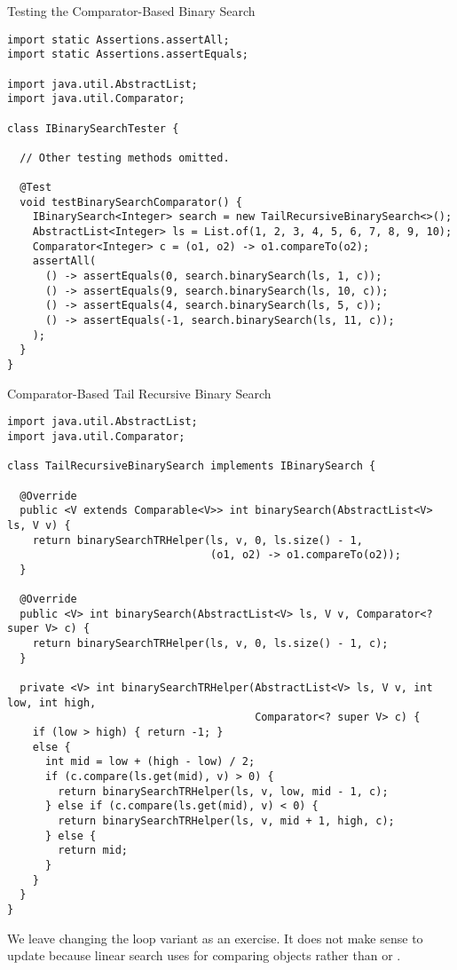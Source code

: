 \begin{cl}{Testing the Comparator-Based Binary Search}
\begin{lstlisting}[language=MyJava]
import static Assertions.assertAll;
import static Assertions.assertEquals;

import java.util.AbstractList;
import java.util.Comparator;

class IBinarySearchTester {

  // Other testing methods omitted.

  @Test
  void testBinarySearchComparator() {
    IBinarySearch<Integer> search = new TailRecursiveBinarySearch<>();
    AbstractList<Integer> ls = List.of(1, 2, 3, 4, 5, 6, 7, 8, 9, 10);
    Comparator<Integer> c = (o1, o2) -> o1.compareTo(o2);
    assertAll(
      () -> assertEquals(0, search.binarySearch(ls, 1, c));
      () -> assertEquals(9, search.binarySearch(ls, 10, c));
      () -> assertEquals(4, search.binarySearch(ls, 5, c));
      () -> assertEquals(-1, search.binarySearch(ls, 11, c));
    );
  }
}
\end{lstlisting}
\end{cl}

\begin{cl}{Comparator-Based Tail Recursive Binary Search}
\begin{lstlisting}[language=MyJava]
import java.util.AbstractList;
import java.util.Comparator;

class TailRecursiveBinarySearch implements IBinarySearch {
  
  @Override
  public <V extends Comparable<V>> int binarySearch(AbstractList<V> ls, V v) {
    return binarySearchTRHelper(ls, v, 0, ls.size() - 1,
                                (o1, o2) -> o1.compareTo(o2));
  }
  
  @Override
  public <V> int binarySearch(AbstractList<V> ls, V v, Comparator<? super V> c) {
    return binarySearchTRHelper(ls, v, 0, ls.size() - 1, c);
  }
  
  private <V> int binarySearchTRHelper(AbstractList<V> ls, V v, int low, int high,
                                       Comparator<? super V> c) {
    if (low > high) { return -1; } 
    else {
      int mid = low + (high - low) / 2;
      if (c.compare(ls.get(mid), v) > 0) { 
        return binarySearchTRHelper(ls, v, low, mid - 1, c); 
      } else if (c.compare(ls.get(mid), v) < 0) { 
        return binarySearchTRHelper(ls, v, mid + 1, high, c); 
      } else { 
        return mid; 
      }
    }
  }
}
\end{lstlisting}
\end{cl}

We leave changing the loop variant as an exercise. It does not make sense to update  because linear search uses  for comparing objects rather than  or .